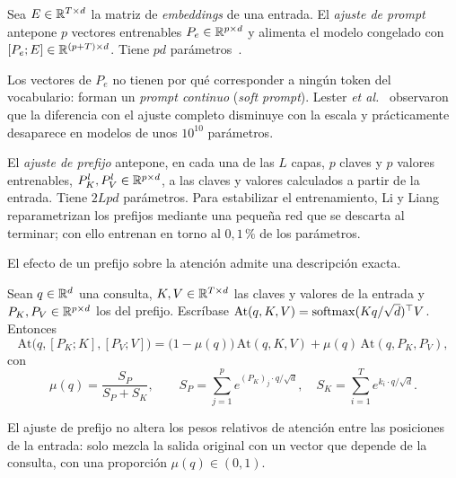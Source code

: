 \begin{definicion}\label{def:prompt-tuning}
Sea $E\in\mathbb{R}^{T\times d}$ la matriz de \emph{embeddings} de una entrada. El \emph{ajuste de prompt} antepone $p$ vectores entrenables $P_e\in\mathbb{R}^{p\times d}$ y alimenta el modelo congelado con $[P_e;E]\in\mathbb{R}^{(p+T)\times d}$. Tiene $pd$ parámetros~\cite{lester}.
\end{definicion}

Los vectores de $P_e$ no tienen por qué corresponder a ningún token del vocabulario: forman un \emph{prompt continuo} (\emph{soft prompt}). Lester \emph{et al.}~\cite{lester} observaron que la diferencia con el ajuste completo disminuye con la escala y prácticamente desaparece en modelos de unos $10^{10}$ parámetros.

\begin{definicion}\label{def:prefix}
El \emph{ajuste de prefijo} antepone, en cada una de las $L$ capas, $p$ claves y $p$ valores entrenables, $P_K^{l},P_V^{l}\in\mathbb{R}^{p\times d}$, a las claves y valores calculados a partir de la entrada. Tiene $2Lpd$ parámetros. Para estabilizar el entrenamiento, Li y Liang~\cite{li-liang} reparametrizan los prefijos mediante una pequeña red que se descarta al terminar; con ello entrenan en torno al $0{,}1\,\%$ de los parámetros.
\end{definicion}

El efecto de un prefijo sobre la atención admite una descripción exacta.

\begin{teorema}\label{teo:prefijo}
Sean $q\in\mathbb{R}^{d}$ una consulta, $K,V\in\mathbb{R}^{T\times d}$ las claves y valores de la entrada y $P_K,P_V\in\mathbb{R}^{p\times d}$ los del prefijo. Escríbase $\mathrm{At}(q,K,V)=\operatorname{softmax}(Kq/\sqrt{d})^{\top} V$. Entonces
\[
\mathrm{At}\bigl(q,[P_K;K],[P_V;V]\bigr)=\bigl(1-\mu(q)\bigr)\,\mathrm{At}(q,K,V)+\mu(q)\,\mathrm{At}(q,P_K,P_V),
\]
con
\[
\mu(q)=\frac{S_P}{S_P+S_K},\qquad S_P=\sum_{j=1}^{p}e^{(P_K)_j\cdot q/\sqrt{d}},\quad S_K=\sum_{i=1}^{T}e^{k_i\cdot q/\sqrt{d}}.
\]
\end{teorema}

\begin{corolario}\label{cor:prefijo}
El ajuste de prefijo no altera los pesos relativos de atención entre las posiciones de la entrada: solo mezcla la salida original con un vector que depende de la consulta, con una proporción $\mu(q)\in(0,1)$.
\end{corolario}

